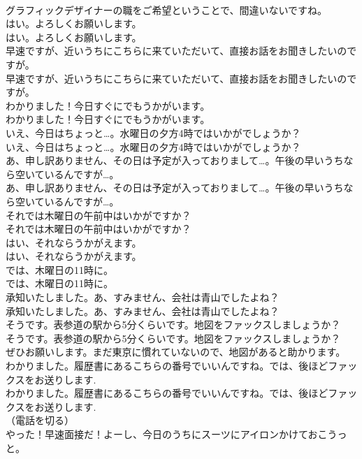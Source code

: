 \documentclass[8pt]{extreport}
\begin{document}
\begin{CJK}{UTF8}{min}
\\	グラフィックデザイナーの職をご希望ということで、間違いないですね。 
\\	はい。よろしくお願いします。	
\\	はい。よろしくお願いします。 
\\	早速ですが、近いうちにこちらに来ていただいて、直接お話をお聞きしたいのですが。	
\\	早速ですが、近いうちにこちらに来ていただいて、直接お話をお聞きしたいのですが。 
\\	わかりました！今日すぐにでもうかがいます。	
\\	わかりました！今日すぐにでもうかがいます。 
\\	いえ、今日はちょっと…。水曜日の夕方4時ではいかがでしょうか？	
\\	いえ、今日はちょっと…。水曜日の夕方4時ではいかがでしょうか？ 
\\	あ、申し訳ありません、その日は予定が入っておりまして…。午後の早いうちなら空いているんですが…。	
\\	あ、申し訳ありません、その日は予定が入っておりまして…。午後の早いうちなら空いているんですが…。 
\\	それでは木曜日の午前中はいかがですか？	
\\	それでは木曜日の午前中はいかがですか？ 
\\	はい、それならうかがえます。	
\\	はい、それならうかがえます。 
\\	では、木曜日の11時に。	
\\	では、木曜日の11時に。 
\\	承知いたしました。あ、すみません、会社は青山でしたよね？	
\\	承知いたしました。あ、すみません、会社は青山でしたよね？ 
\\	そうです。表参道の駅から5分くらいです。地図をファックスしましょうか？	
\\	そうです。表参道の駅から5分くらいです。地図をファックスしましょうか？ 
\\	ぜひお願いします。まだ東京に慣れていないので、地図があると助かります。	
\\	わかりました。履歴書にあるこちらの番号でいいんですね。では、後ほどファックスをお送りします.	
\\	わかりました。履歴書にあるこちらの番号でいいんですね。では、後ほどファックスをお送りします. 
\\	（電話を切る）	
\\	やった！早速面接だ！よーし、今日のうちにスーツにアイロンかけておこうっと。	

\end{CJK}
\end{document}
